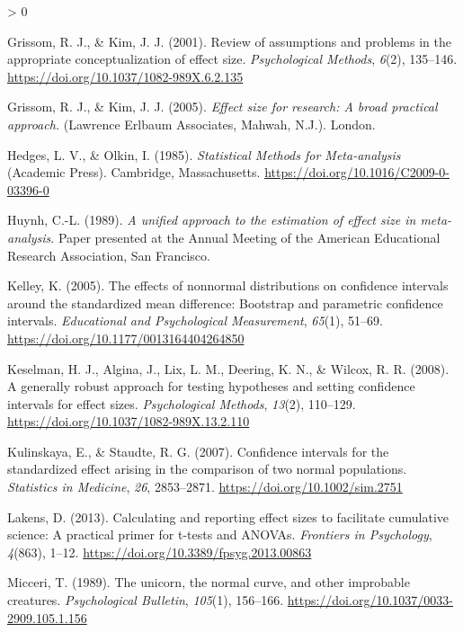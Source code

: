 \documentclass[
  english,
  man,floatsintext]{apa6}
\newlength{\cslhangindent}
\newenvironment{CSLReferences}[2] %
 {%
  \setlength{\parindent}{0pt}
  \ifodd #1 \everypar{\setlength{\hangindent}{\cslhangindent}}\ignorespaces\fi
  \ifnum #2 > 0
  \setlength{\parskip}{#2\baselineskip}
  \fi
 }%
 {}
\begin{document}
\begin{CSLReferences}{1}{0}
\leavevmode\hypertarget{ref-Grissom_Kim_2001}{}%
Grissom, R. J., \& Kim, J. J. (2001). Review of assumptions and problems in the appropriate conceptualization of effect size. \emph{Psychological Methods}, \emph{6}(2), 135--146. \url{https://doi.org/10.1037/1082-989X.6.2.135}

\leavevmode\hypertarget{ref-Grissom_and_kim_2005}{}%
Grissom, R. J., \& Kim, J. J. (2005). \emph{Effect size for research: A broad practical approach.} (Lawrence Erlbaum Associates, Mahwah, N.J.). London.

\leavevmode\hypertarget{ref-Hedges_Olkin_1985}{}%
Hedges, L. V., \& Olkin, I. (1985). \emph{Statistical {M}ethods for {M}eta-analysis} (Academic Press). Cambridge, Massachusetts. \url{https://doi.org/10.1016/C2009-0-03396-0}

\leavevmode\hypertarget{ref-Huynh_1989}{}%
Huynh, C.-L. (1989). \emph{A unified approach to the estimation of effect size in meta-analysis}. Paper presented at the {A}nnual {M}eeting of the {A}merican {E}ducational {R}esearch {A}ssociation, San Francisco.

\leavevmode\hypertarget{ref-Kelley_2005}{}%
Kelley, K. (2005). The effects of nonnormal distributions on confidence intervals around the standardized mean difference: Bootstrap and parametric confidence intervals. \emph{{E}ducational and {P}sychological {M}easurement}, \emph{65}(1), 51--69. \url{https://doi.org/10.1177/0013164404264850}

\leavevmode\hypertarget{ref-Keselman_et_al_2008}{}%
Keselman, H. J., Algina, J., Lix, L. M., Deering, K. N., \& Wilcox, R. R. (2008). A generally robust approach for testing hypotheses and setting confidence intervals for effect sizes. \emph{Psychological Methods}, \emph{13}(2), 110--129. \url{https://doi.org/10.1037/1082-989X.13.2.110}

\leavevmode\hypertarget{ref-Kulinskaya_Staudte_2007}{}%
Kulinskaya, E., \& Staudte, R. G. (2007). Confidence intervals for the standardized effect arising in the comparison of two normal populations. \emph{{S}tatistics in {M}edicine}, \emph{26}, 2853--2871. \url{https://doi.org/10.1002/sim.2751}

\leavevmode\hypertarget{ref-Lakens_2013}{}%
Lakens, D. (2013). Calculating and reporting effect sizes to facilitate cumulative science: A practical primer for t-tests and {ANOVA}s. \emph{Frontiers in Psychology}, \emph{4}(863), 1--12. \url{https://doi.org/10.3389/fpsyg.2013.00863}

\leavevmode\hypertarget{ref-Micceri_1989}{}%
Micceri, T. (1989). The unicorn, the normal curve, and other improbable creatures. \emph{Psychological Bulletin}, \emph{105}(1), 156--166. \url{https://doi.org/10.1037/0033-2909.105.1.156}


\end{CSLReferences}
\end{document}
